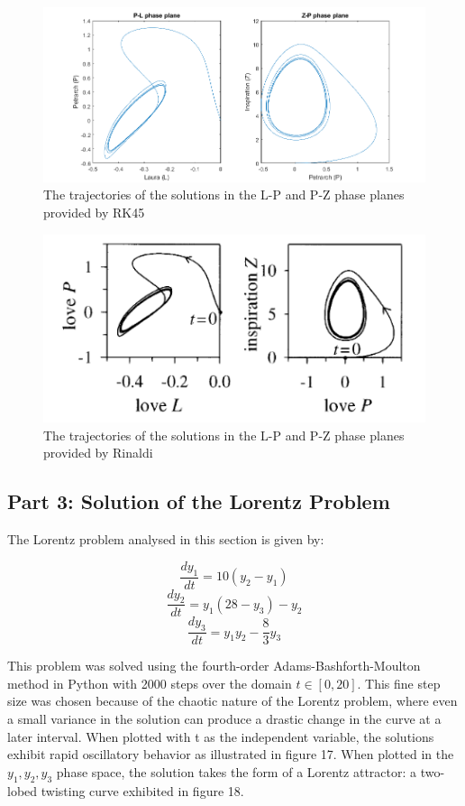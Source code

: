 \documentclass[11pt]{article}
\begin{document}
\begin{figure} [h]
\centering
        \includegraphics[totalheight=7cm]{evol2.png}
    \caption{The trajectories of the solutions in the L-P and P-Z phase planes provided by RK45}
    \label{figure6}
\end{figure}

\begin{figure} [h]
\centering
        \includegraphics[totalheight=7cm]{pic1.png}
    \caption{The trajectories of the solutions in the L-P and P-Z phase planes provided by Rinaldi}
    \label{figure6}
\end{figure}

\subsection{Part 3: Solution of the Lorentz Problem}
%
The Lorentz problem analysed in this section is given by: 

$$\frac{dy_{1}}{dt}=10(y_{2}-y_{1})$$
$$\frac{dy_{2}}{dt}=y_{1}(28-y_{3})-y_{2}$$
$$\frac{dy_{3}}{dt}=y_{1}y_{2}-\frac{8}{3}y_{3}$$

This problem was solved using the fourth-order Adams-Bashforth-Moulton method in
Python with 2000 steps over the domain $t\in [0,20]$. This fine step size was chosen
because of the chaotic nature of the Lorentz problem, where even a small variance
in the solution can produce a drastic change in the curve at a later interval. 
When plotted with t as the independent variable, the solutions exhibit rapid 
oscillatory behavior as illustrated in figure 17. When plotted in the 
$y_{1}, y_{2}, y_{3}$ phase space, the solution takes the form of a Lorentz attractor:
a two-lobed twisting curve exhibited in figure 18.
\end{document}
